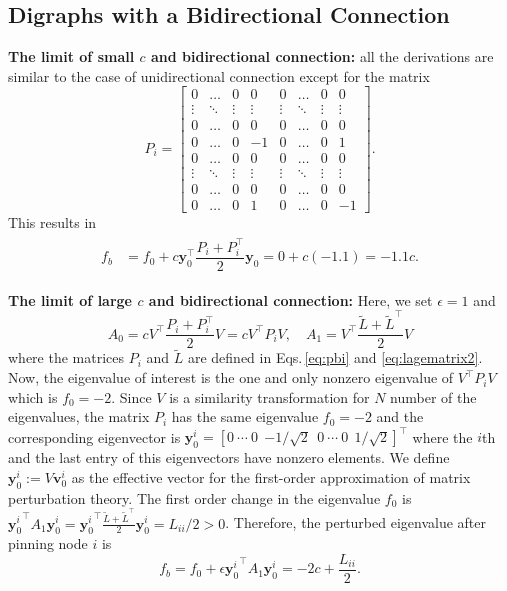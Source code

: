 \documentclass[%
 reprint,
 amsmath,amssymb,
 aip,
]{revtex4-2}
\def \by {\pmb{y}}
\def \bv {\pmb{v}}
\theoremstyle{italichead}
\theoremstyle{definition}
\begin{document}
{\subsection{Digraphs with a Bidirectional Connection} \label{sec:bi}


\textbf{The limit of small $c$ and bidirectional connection:} all the derivations are similar to the case of unidirectional connection except for the matrix
\begin{equation} \label{eq:pbi}
    P_i = 
    \begin{bmatrix}
    0 & \hdots & 0 & 0 & 0 & \hdots & 0 & 0 \\ 
    \vdots & \ddots & \vdots & \vdots & \vdots & \ddots & \vdots & \vdots \\ 
    0 & \hdots & 0 & 0 & 0 & \hdots & 0 & 0 \\ 
    0 & \hdots & 0 & -1 & 0 & \hdots & 0 & 1 \\ 
    0 & \hdots & 0 & 0 & 0 & \hdots & 0 & 0 \\ 
    \vdots & \ddots & \vdots & \vdots & \vdots & \ddots & \vdots & \vdots \\ 
    0 & \hdots & 0 & 0 & 0 & \hdots & 0 & 0 \\ 
    0 & \hdots & 0 & 1 & 0 & \hdots & 0 & -1
    \end{bmatrix}.
\end{equation}
This results in
\begin{align}
\begin{split} 
    f_b & = f_0 + c \by_0^\top \dfrac{P_i + P_i ^\top}{2} \by_0 = 0 + c (-1.1) = -1.1 c.
\end{split}
\end{align}




\textbf{The limit of large $c$ and bidirectional connection:}
Here, we set $\epsilon = 1$ and
\begin{equation}
    A_0 = c V^\top \frac{P_i+P_i^\top}{2}V = c V^\top P_i V, \quad A_1 = V^\top \dfrac{\tilde{L} + \tilde{L}^\top}{2} V
\end{equation}
where the matrices $P_i$ and $\tilde{L}$ are defined in Eqs.\,\eqref{eq:pbi} and \eqref{eq:lagematrix2}.
Now, the eigenvalue of interest is the one and only nonzero eigenvalue of $V^\top P_i V$ which is $f_0 = -2$.
Since $V$ is a similarity transformation for $N$ number of the eigenvalues, the matrix $P_i$ has the same eigenvalue $f_0 = -2$ and the corresponding eigenvector is $\by_0^i = [0 \ \cdots \ 0 \ \ {-1/\sqrt{2}} \ \ 0 \ \cdots \ 0 \ \ 1/\sqrt{2} ]^\top$ where the $i$th and the last entry of this eigenvectors have nonzero elements.
We define $\by_0^i := V\bv_0^i$ as the effective vector for the first-order approximation of matrix perturbation theory.
The first order change in the eigenvalue $f_0$ is ${\by_0^i}^\top A_1 \by_0^i = {\by_0^i}^\top \frac{\tilde{L} + \tilde{L}^\top}{2} \by_0^i = L_{ii} /2 > 0$.
Therefore, the perturbed eigenvalue after pinning node $i$ is
\begin{equation}
    f_b = f_0 + \epsilon {\by_0^i}^\top A_1 \by_0^i = -2c + \dfrac{L_{ii}}{2}.
\end{equation}


}
\end{document}
